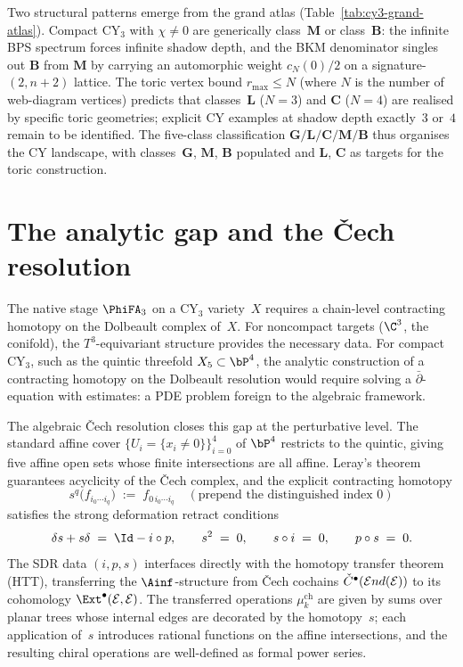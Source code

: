 \begin{remark}
Two structural patterns emerge from the grand atlas
(Table~\ref{tab:cy3-grand-atlas}). Compact CY$_3$ with
$\chi \neq 0$ are generically class~$\mathbf{M}$ or class~$\mathbf{B}$:
the infinite BPS spectrum forces infinite shadow depth, and the
BKM denominator singles out $\mathbf{B}$ from $\mathbf{M}$ by carrying
an automorphic weight $c_N(0)/2$ on a signature-$(2,n+2)$ lattice.
The toric vertex bound $r_{\max} \leq N$ (where $N$ is the number
of web-diagram vertices) predicts that classes~$\mathbf{L}$
($N = 3$) and $\mathbf{C}$ ($N = 4$) are realised by
specific toric geometries; explicit CY examples at shadow
depth exactly~$3$ or~$4$ remain to be identified. The
five-class classification
$\mathbf{G}/\mathbf{L}/\mathbf{C}/\mathbf{M}/\mathbf{B}$ thus organises
the CY landscape, with classes~$\mathbf{G}$, $\mathbf{M}$, $\mathbf{B}$
populated and $\mathbf{L}$, $\mathbf{C}$ as targets for the toric
construction.
\end{remark}

\section{The analytic gap and the \v{C}ech resolution}
\label{sec:analytic-gap}

The native stage $\PhiFA_3$ on a CY$_3$ variety~$X$ requires
a chain-level contracting homotopy on the Dolbeault complex
of~$X$. For noncompact targets ($\C^3$, the conifold), the
$T^3$-equivariant structure provides the necessary data. For
compact CY$_3$, such as the quintic threefold
$X_5 \subset \bP^4$, the analytic construction of a
contracting homotopy on the Dolbeault resolution would
require solving a $\bar\partial$-equation with estimates: a
PDE problem foreign to the algebraic framework.

The algebraic \v{C}ech resolution closes this gap at the
perturbative level. The standard affine cover
$\{U_i = \{x_i \neq 0\}\}_{i=0}^{4}$ of $\bP^4$ restricts to
the quintic, giving five affine open sets whose finite
intersections are all affine. Leray's theorem guarantees
acyclicity of the \v{C}ech complex, and the explicit
contracting homotopy
\[
 s^q\bigl(f_{i_0 \cdots i_q}\bigr)
 \;:=\; f_{0\, i_0 \cdots i_q}
 \quad(\text{prepend the distinguished index }0)
\]
satisfies the strong deformation retract conditions
\[
 \delta s + s \delta \;=\; \Id - i \circ p,
 \qquad s^2 \;=\; 0,
 \qquad s \circ i \;=\; 0,
 \qquad p \circ s \;=\; 0.
\]
The SDR data $(i, p, s)$ interfaces directly with the
homotopy transfer theorem (HTT), transferring the
$\Ainf$-structure from \v{C}ech cochains
$\check{C}^\bullet(\mathcal{E} nd(\mathcal{E}))$ to its cohomology
$\Ext^\bullet(\cE, \cE)$. The transferred operations
$\mu_k^{\mathrm{ch}}$ are given by sums over planar trees
whose internal edges are decorated by the homotopy~$s$; each
application of~$s$ introduces rational functions on the
affine intersections, and the resulting chiral operations
are well-defined as formal power series.

